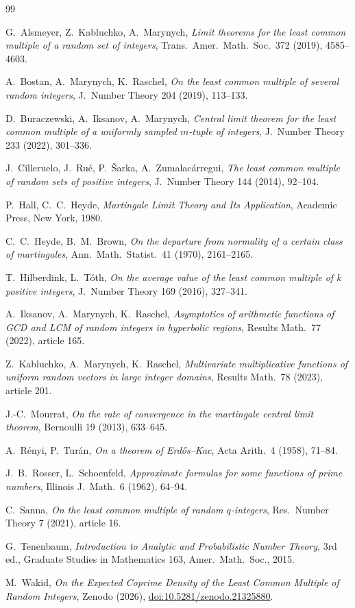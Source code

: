 \documentclass[11pt]{article}
\theoremstyle{remark}
\begin{document}
\begin{thebibliography}{99}

G.~Alsmeyer, Z.~Kabluchko, A.~Marynych, \emph{Limit theorems for the least common multiple of a random set of integers}, Trans.\ Amer.\ Math.\ Soc.\ 372 (2019), 4585--4603.

A.~Bostan, A.~Marynych, K.~Raschel, \emph{On the least common multiple of several random integers}, J.\ Number Theory 204 (2019), 113--133.

D.~Buraczewski, A.~Iksanov, A.~Marynych, \emph{Central limit theorem for the least common multiple of a uniformly sampled $m$-tuple of integers}, J.\ Number Theory 233 (2022), 301--336.

J.~Cilleruelo, J.~Ru\'e, P.~\v{S}arka, A.~Zumalac\'arregui, \emph{The least common multiple of random sets of positive integers}, J.\ Number Theory 144 (2014), 92--104.

P.~Hall, C.~C.~Heyde, \emph{Martingale Limit Theory and Its Application}, Academic Press, New York, 1980.

C.~C.~Heyde, B.~M.~Brown, \emph{On the departure from normality of a certain class of martingales}, Ann.\ Math.\ Statist.\ 41 (1970), 2161--2165.

T.~Hilberdink, L.~T\'oth, \emph{On the average value of the least common multiple of $k$ positive integers}, J.\ Number Theory 169 (2016), 327--341.

A.~Iksanov, A.~Marynych, K.~Raschel, \emph{Asymptotics of arithmetic functions of GCD and LCM of random integers in hyperbolic regions}, Results Math.\ 77 (2022), article 165.

Z.~Kabluchko, A.~Marynych, K.~Raschel, \emph{Multivariate multiplicative functions of uniform random vectors in large integer domains}, Results Math.\ 78 (2023), article 201.

J.-C.~Mourrat, \emph{On the rate of convergence in the martingale central limit theorem}, Bernoulli 19 (2013), 633--645.

A.~R\'enyi, P.~Tur\'an, \emph{On a theorem of Erd\H{o}s--Kac}, Acta Arith.\ 4 (1958), 71--84.

J.~B.~Rosser, L.~Schoenfeld, \emph{Approximate formulas for some functions of prime numbers}, Illinois J.\ Math.\ 6 (1962), 64--94.

C.~Sanna, \emph{On the least common multiple of random $q$-integers}, Res.\ Number Theory 7 (2021), article 16.

G.~Tenenbaum, \emph{Introduction to Analytic and Probabilistic Number Theory}, 3rd ed., Graduate Studies in Mathematics 163, Amer.\ Math.\ Soc., 2015.

M.~Wakid, \emph{On the Expected Coprime Density of the Least Common Multiple of Random Integers}, Zenodo (2026), \href{https://doi.org/10.5281/zenodo.21325880}{doi:10.5281/zenodo.21325880}.

\end{thebibliography}
\end{document}
